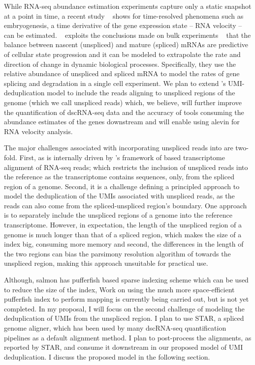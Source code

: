 While RNA-seq abundance estimation experiments capture only a static snapshot at a point in time, 
a recent study ~\citep{la2018rna} shows for time-resolved phenomena such as embryogenesis, a time 
derivative of the gene expression state -- RNA velocity -- can be estimated. ~\cite{la2018rna} 
exploits the conclusions made on bulk experiments ~\citep{zeisel2011coupled} that the balance between 
nascent (unspliced) and mature (spliced) mRNAs are predictive of cellular state progression and it 
can be modeled to extrapolate the rate and direction of change in dynamic biological processes. 
Specifically, they use the relative abundance of unspliced and spliced mRNA to model the rates of 
gene splicing and degradation in a single cell experiment. We plan to extend \alevin's UMI-deduplication 
model to include the reads aligning to unspliced regions of the genome (which we call unspliced reads) which, 
we believe, will further improve the quantification of dscRNA-seq data and the accuracy of tools consuming
the abundance estimates of the genes downstream and will enable using alevin for RNA velocity analysis.

The major challenges associated with incorporating unspliced reads into \alevin are two-fold.
First, as \alevin is internally driven by \salmon's framework of \rapmap based transcriptome 
alignment of RNA-seq reads; which restricts the inclusion of unspliced reads into the reference 
as the transcriptome contains sequences, only, from the spliced region of a genome. 
Second, it is a challenge defining a principled approach to model the deduplication of the UMIs associated 
with unspliced reads, as the reads can also come from the spliced-unspliced region's boundary. 
One \naive approach is to separately include the unspliced regions of a genome into the reference 
transcriptome. However, in expectation, the length of the unspliced region of a genome is much 
longer than that of a spliced region, which makes the size of a \salmon index big, 
consuming more memory and second, the differences in the length of the two regions can bias 
the parsimony resolution algorithm of \alevin towards the unspliced region, making this 
\naive approach unsuitable for practical use.

Although, salmon has pufferfish based sparse indexing scheme which can be used to reduce the size of 
the index,  Work on using the much more space-efficient pufferfish index to perform mapping is 
currently being carried out, but is not yet completed. In my proposal, I will focus on the second challenge 
of modeling the deduplication of UMIs from the unspliced region. I plan to use STAR, a spliced genome aligner, 
which has been used by many dscRNA-seq quantification pipelines as a default alignment method.
I plan to post-process the alignments, as reported by STAR, and consume it downstream in
our proposed model of UMI deduplication. I discuss the proposed model in the following section.

